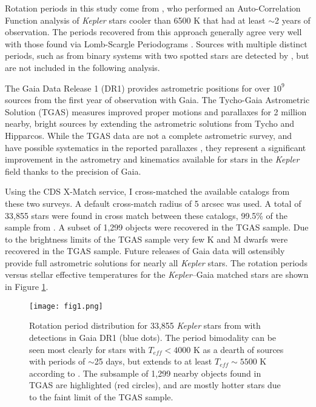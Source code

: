 \documentclass[manuscript, letterpaper]{aastex6}
\makeatletter
\let\origsection\section
\renewcommand\section{\@ifstar{\starsection}{\nostarsection}}
\newcommand\nostarsection[1]{\sectionprelude\origsection{#1}}
\newcommand\starsection[1]{\sectionprelude\origsection*{#1}}
\newcommand\sectionprelude{\vspace{1em}}
\newcommand{\Kepler}{\textsl{Kepler}\xspace}
\makeatother
\begin{document}
\section{The \Kepler--Gaia Data}
Rotation periods in this study come from \citet{mcquillan2014}, who performed an Auto-Correlation Function analysis of \Kepler stars cooler than 6500 K that had at least $\sim$2 years of observation. The periods recovered from this approach generally agree very well with those found via Lomb-Scargle Periodograms \citep[e.g.][]{reinhold2013,aigrain2015}. Sources with multiple distinct periods, such as from binary systems with two spotted stars \citep[e.g.][]{lurie2015} are detected by \citet{mcquillan2014}, but are not included in the following analysis.

The Gaia Data Release 1 (DR1) provides astrometric positions for over $10^9$ sources from the first year of observation with Gaia. The Tycho-Gaia Astrometric Solution (TGAS) measures improved proper motions and parallaxes for 2 million nearby, bright sources by extending the astrometric solutions from Tycho and Hipparcos. While the TGAS data are not a complete astrometric survey, and have possible systematics in the reported parallaxes \citep{stassun2016}, they represent a significant improvement in the astrometry and kinematics available for stars in the \Kepler field thanks to the precision of Gaia.


Using the CDS X-Match service, I cross-matched the available catalogs from these two surveys. A default cross-match radius of 5 arcsec was used. A total of 33,855 stars were found in cross match between these catalogs, 99.5\% of the sample from \citet{mcquillan2014}. 
A subset of 1,299 objects were recovered in the TGAS sample. Due to the brightness limits of the TGAS sample very few K and M dwarfs were recovered in the TGAS sample. Future releases of Gaia data will ostensibly provide full astrometric solutions for nearly all \Kepler stars. The rotation periods versus stellar effective temperatures for the \Kepler--Gaia matched stars are shown in Figure \ref{fig:all}. 



\begin{figure}[]
\centering
\texttt{[image: fig1.png]}
\caption{
Rotation period distribution for 33,855 \Kepler stars from \citet{mcquillan2014} with detections in Gaia DR1 (blue dots). The period bimodality can be seen most clearly for stars with $T_{eff} < 4000$ K as a dearth of sources with periods of $\sim$25 days, but extends to at least $T_{eff}\sim5500$ K according to \citet{mcquillan2014}. The subsample of 1,299 nearby objects found in TGAS are highlighted (red circles), and are mostly hotter stars due to the faint limit of the TGAS sample. 
}
\label{fig:all}
\end{figure}
\end{document}
